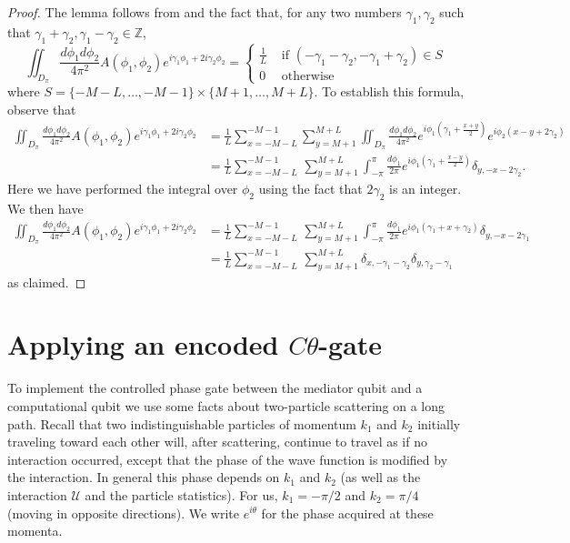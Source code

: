\documentclass[../thesis-main/thesis-main]{subfiles}
\begin{document}
\begin{proof}
The lemma follows from  and the fact that, for any two numbers $\gamma_{1},\gamma_{2}$ such that $\gamma_{1}+\gamma_{2},\gamma_{1}-\gamma_{2}\in \mathbb{Z}$,
\[
\iint_{D_\pi}\frac{d\phi_{1} d\phi_{2}}{4\pi^2} A(\phi_{1},\phi_{2})e^{i\gamma_{1}\phi_{1}+2i \gamma_{2}\phi_{2}}=\begin{cases}
\frac{1}{L} &\text{ if }(-\gamma_{1}-\gamma_{2},-\gamma_{1}+\gamma_{2})\in S \\
0 &\text{ otherwise}
\end{cases}
\]
where $S = \{-M-L,\ldots, -M-1\} \times \{M+1,\ldots, M+L\}$.  To establish this formula, observe that
\begin{align*}
  \iint_{D_{\pi}}\frac{d\phi_1 d\phi_{2}}{4\pi^2}A(\phi_{1},\phi_{2})e^{ i\gamma_{1}\phi_{1}+2i\gamma_{2}\phi_{2}} 
  	& =  \frac{1}{L}\sum_{x=-M-L}^{-M-1}\sum_{y=M+1}^{M+L}\iint_{D_{\pi}}\frac{d\phi_1 d\phi_{2}}{4\pi^2}
  		e^{i\phi_{1}\left(\gamma_{1}+\frac{x+y}{2}\right)}e^{i\phi_{2}\left(x-y+2\gamma_{2}\right)}\\
 & =  \frac{1}{L}\sum_{x=-M-L}^{-M-1}\,\sum_{y=M+1}^{M+L}\int_{-\pi}^{\pi}\frac{d\phi_{1}}{2\pi}
 	e^{i\phi_{1}\left(\gamma_{1}+\frac{x-y}{2}\right)}\delta_{y,-x-2\gamma_{2}}.
\end{align*}
 Here we have performed the integral over $\phi_{2}$ using the fact
that $2\gamma_{2}$ is an integer.  We then have
\begin{align*}
\iint_{D_\pi}\frac{d\phi_{1} d\phi_{2}}{4\pi^2} A(\phi_{1},
	\phi_{2})e^{i\gamma_{1}\phi_{1}+2i\gamma_{2}\phi_{2}} 
 & =  \frac{1}{L}\sum_{x=-M-L}^{-M-1}\,
	\sum_{y=M+1}^{M+L}\int_{-\pi}^{\pi}\frac{d\phi_{1}}{2\pi}e^{i\phi_{1}
	\left(\gamma_{1}+x+\gamma_{2}\right)}\delta_{y,-x-2\gamma_{1}}\\
 & =  \frac{1}{L}\sum_{x=-M-L}^{-M-1}\,\sum_{y=M+1}^{M+L}\delta_{x,-\gamma_{1}-\gamma_{2}}\delta_{y,\gamma_{2}-\gamma_{1}}
 \end{align*}
as claimed.
\end{proof}

%

\section{Applying an encoded $C\theta$-gate}



To implement the controlled phase gate between the mediator qubit and a computational qubit we use some facts about two-particle scattering on a long path. Recall  that two indistinguishable particles of momentum $k_1$ and $k_2$ initially traveling toward each other will, after scattering, continue to travel as if no interaction occurred, except that the phase of the wave function is modified by the interaction. In general this phase depends on $k_1$ and $k_2$ (as well as the interaction $\mathcal{U}$ and the particle statistics).  For us, $k_1=-{\pi}/{2}$ and $k_2={\pi}/{4}$ (moving in opposite directions).  We write $e^{i\theta}$ for the phase acquired at these momenta.
\end{document}
